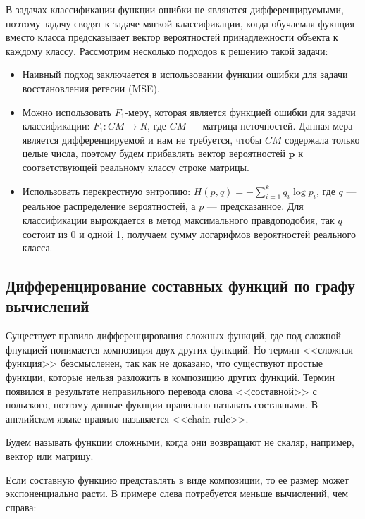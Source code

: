 В задачах классификации функции ошибки не являются дифференцируемыми, поэтому
задачу сводят к задаче мягкой классификации, когда обучаемая фукнция вместо
класса предсказывает вектор вероятностей принадлежности объекта к каждому
классу. Рассмотрим несколько подходов к решению такой задачи:

\begin{itemize}
    \item Наивный подход заключается в использовании функции ошибки для задачи
восстановления регесии (MSE).

    \item Можно использовать $F_1$-меру, которая является функцией ошибки для
        задачи классификации: $F_1 : CM \to R$, где $CM$ --- матрица
        неточностей. Данная мера является дифференцируемой и нам не требуется,
        чтобы $CM$ содержала только целые числа, поэтому будем прибавлять
        вектор вероятностей $\bm{p}$ к соответствующей реальному классу строке
        матрицы.

    \item Использовать перекрестную энтропию: $H(p, q) = - \sum_{i=1}^{k} q_i
        \log p_i$, где $q$ --- реальное распределение вероятностей, а $p$ ---
        предсказанное. Для классификации вырождается в метод максимального
        правдоподобия, так $q$ состоит из 0 и одной 1, получаем сумму
        логарифмов вероятностей реального класса.
\end{itemize}

\subsection{Дифференцирование составных функций по графу вычислений}

Существует правило дифференцирования сложных функций, где под сложной фнукцией
понимается композиция двух других функций. Но термин <<сложная функция>>
безсмысленен, так как не доказано, что существуют простые функции, которые
нельзя разложить в композицию других функций. Термин появился в результате неправильного
перевода слова <<составной>> с польского, поэтому данные фукнции правильно называть
составными. В английском языке правило называется <<chain rule>>.

Будем называть функции сложными, когда они возвращают не скаляр, например,
вектор или матрицу.

Если составную функцию представлять в виде композиции, то ее размер может
экспоненциально расти. В примере слева потребуется меньше вычислений, чем
справа:

